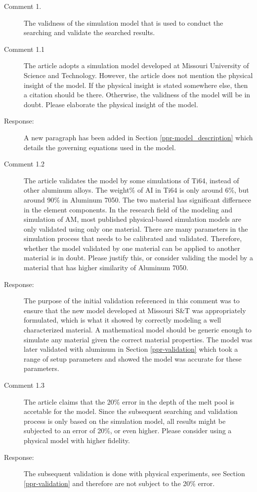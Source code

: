 \documentclass{article}
\begin{document}
\begin{description}
	\item[Comment 1.] The validness of the simulation model that is used to conduct the searching and validate the searched results.
	\item[Comment 1.1] The article adopts a simulation model developed at Missouri University of Science and Technology. However, the article does not mention the physical insight of the model. If the physical insight is stated somewhere else, then a citation should be there. Otherwise, the validness of the model will be in doubt. Please elaborate the physical insight of the model.
 	\item[Response:] A new paragraph has been added in Section \ref{ppr-model_description} which details the governing equations used in the model.
	\item[Comment 1.2] The article validates the model by some simulations of Ti64, instead of other aluminum alloys. The weight\% of AI in Ti64 is only around 6\%, but around 90\% in Aluminum 7050. The two material has significant differnece in the element components. In the research field of the modeling and simulation of AM, most published physical-based simulation models are only validated using only one material. There are many parameters in the simulation process that needs to be calibrated and validated. Therefore, whether the model validated by one material can be applied to another material is in doubt. Please justify this, or consider validing the model by a material that has higher similarity of Aluminum 7050. 
 	\item[Response:] The purpose of the initial validation referenced in this comment was to ensure that the new model developed at Missouri S\&T was appropriately formulated, which is what it showed by correctly modeling a well characterized material.  A mathematical model should be generic enough to simulate any material given the correct material properties.  The model was later validated with aluminum in Section \ref{ppr-validation} which took a range of setup parameters and showed the model was accurate for these parameters.
	\item[Comment 1.3] The article claims that the 20\% error in the depth of the melt pool is accetable for the model. Since the subsequent searching and validation process is only based on the simulation model, all results might be subjected to an error of 20\%, or even higher. Please consider using a physical model with higher fidelity.
 	\item[Response:] The subsequent validation is done with physical experiments, see Section \ref{ppr-validation} and therefore are not subject to the 20\% error.

\end{description}
\end{document}
